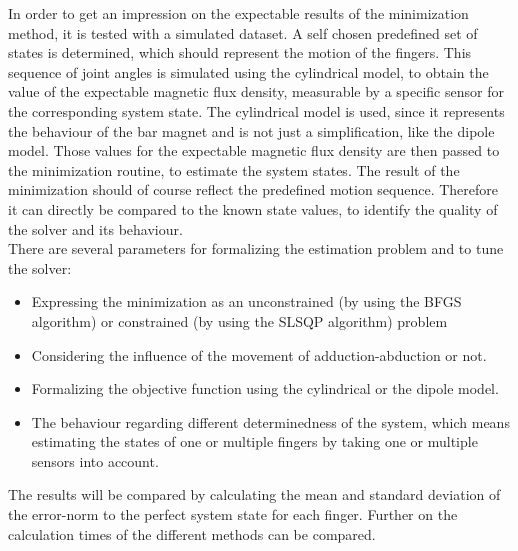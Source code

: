 In order to get an impression on the expectable results of the minimization method, it is tested with a simulated dataset. A self chosen predefined set of states is determined, which should represent the motion of the fingers. This sequence of joint angles is simulated using the cylindrical model, to obtain the value of the expectable magnetic flux density, measurable by a specific sensor for the corresponding system state. The cylindrical model is used, since it represents the behaviour of the bar magnet and is not just a simplification, like the dipole model. Those values for the expectable magnetic flux density are then passed to the minimization routine, to estimate the system states. The result of the minimization should of course reflect the predefined motion sequence. Therefore it can directly be compared to the known state values, to identify the quality of the solver and its behaviour.\\
There are several parameters for formalizing the estimation problem and to tune the solver:
\begin{itemize}
\item Expressing the minimization as an unconstrained (by using the \ac{BFGS} algorithm) or constrained (by using the \ac{SLSQP} algorithm) problem
\item Considering the influence of the movement of adduction-abduction or not.
\item Formalizing the objective function using the cylindrical or the dipole model.
\item The behaviour regarding different determinedness of the system, which means estimating the states of one or multiple fingers by taking one or multiple sensors into account.
\end{itemize}
The results will be compared by calculating the mean and standard deviation of the error-norm to the perfect system state for each finger. Further on the calculation times of the different methods can be compared.

